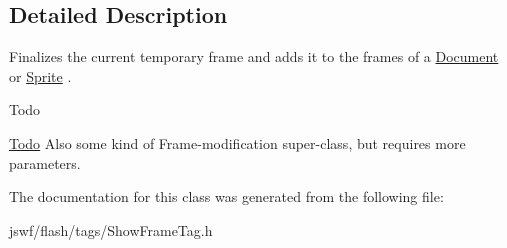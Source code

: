 \subsection{Detailed Description}
Finalizes the current temporary frame and adds it to the {\ttfamily frames} of a \hyperlink{classjswf_1_1flash_1_1_document}{Document} or \hyperlink{classjswf_1_1flash_1_1_sprite}{Sprite} . 

\begin{DoxyRefDesc}{Todo}
\item[\hyperlink{todo__todo000019}{Todo}]Also some kind of Frame-\/modification super-\/class, but requires more parameters. \end{DoxyRefDesc}


The documentation for this class was generated from the following file\+:\begin{DoxyCompactItemize}
\item 
jswf/flash/tags/Show\+Frame\+Tag.\+h\end{DoxyCompactItemize}
